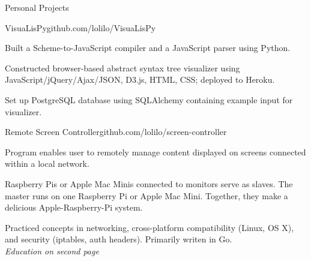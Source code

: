 \documentclass{resume} %
\begin{document}

\begin{rSection}{Personal Projects}


\begin{rSubsection}{VisuaLisPy}{github.com/lolilo/VisuaLisPy}{}{}
\item Built a Scheme-to-JavaScript compiler and a JavaScript parser using Python.
\item Constructed browser-based abstract syntax tree visualizer using JavaScript/jQuery/Ajax/JSON, D3.js, HTML, CSS; deployed to Heroku.
\item Set up PostgreSQL database using SQLAlchemy containing example input for visualizer.
\end{rSubsection}


\begin{rSubsection}{Remote Screen Controller}{github.com/lolilo/screen-controller}{}{}
\item Program enables user to remotely manage content displayed on screens connected within a local network.
\item Raspberry Pis or Apple Mac Minis connected to monitors serve as slaves. The master runs on one Raspberry Pi or Apple Mac Mini. Together, they make a delicious Apple-Raspberry-Pi system.
\item Practiced concepts in networking, cross-platform compatibility (Linux, OS X), and security (iptables, auth headers). Primarily writen in Go. \\



{\em Education on second page}
\end{rSubsection}

\end{rSection}

\end{document}
